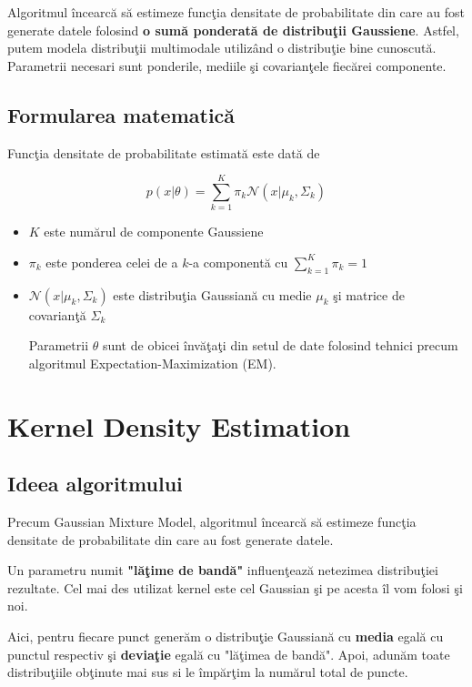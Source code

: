 Algoritmul încearcă să estimeze funcţia densitate de probabilitate 
din care au fost generate datele folosind 
\textbf{o sumă ponderată de distribuţii Gaussiene}.
Astfel, putem modela distribuţii multimodale utilizând o distribuţie bine cunoscută.
Parametrii necesari sunt ponderile, mediile şi covarianţele fiecărei componente.

\subsection{Formularea matematică}

Funcţia densitate de probabilitate estimată este dată de 

\begin{equation}
    p(x | \theta) = \sum_{k=1}^{K} \pi_k \mathcal{N}(x | \mu_k, \Sigma_k)
    \end{equation}
    
    \begin{itemize}
        \item $K$ este numărul de componente Gaussiene
        \item $\pi_k$ este ponderea celei de a $k$-a componentă cu $\sum_{k=1}^{K} \pi_k = 1$
        \item $\mathcal{N}(x | \mu_k, \Sigma_k)$ este distribuţia Gaussiană
        cu medie $\mu_k$ şi matrice de covarianţă $\Sigma_k$
    
    Parametrii $\theta$ sunt de obicei învăţaţi din setul de date folosind 
    tehnici precum algoritmul Expectation-Maximization (EM).
    \end{itemize}

\section{Kernel Density Estimation}

\subsection{Ideea algoritmului}

Precum Gaussian Mixture Model, algoritmul încearcă să estimeze 
funcţia densitate de probabilitate din care au fost generate datele.

Un parametru numit \textbf{"lăţime de bandă"} influenţează netezimea distribuţiei 
rezultate.
Cel mai des utilizat kernel este cel Gaussian şi pe acesta îl vom folosi şi noi.

Aici, pentru fiecare punct generăm o distribuţie Gaussiană cu \textbf{media} egală
cu punctul respectiv şi \textbf{deviaţie} egală cu "lăţimea de bandă". Apoi, adunăm toate 
distribuţiile obţinute mai sus si le împărţim la numărul total de puncte.

